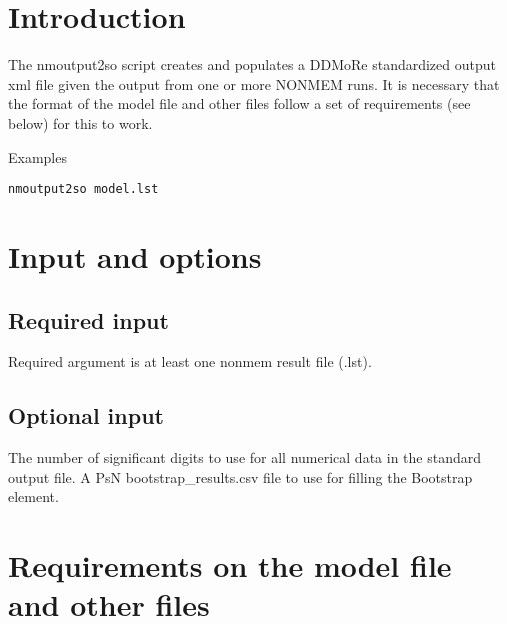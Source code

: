 



\maketitle

\section{Introduction}
The nmoutput2so script creates and populates a DDMoRe standardized output xml file given the output from one or more NONMEM runs. It is necessary that the format of the model file and other files follow a set of requirements (see below) for this to work. 


Examples
\begin{verbatim}
nmoutput2so model.lst
\end{verbatim}

\section{Input and options}

\subsection{Required input}
Required argument is at least one nonmem result file (.lst).


\subsection{Optional input}

\begin{optionlist}
The number of significant digits to use for all numerical data in the standard output file.
\nextopt
{}
A PsN bootstrap\_results.csv file to use for filling the Bootstrap element.
\end{optionlist}

\section{Requirements on the model file and other files}

